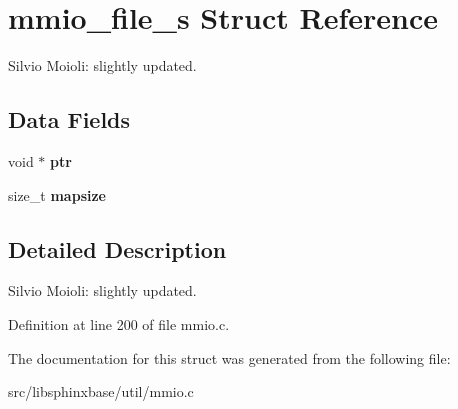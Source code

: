 \section{mmio\-\_\-file\-\_\-s Struct Reference}
\label{structmmio__file__s}


Silvio Moioli\-: slightly updated.  


\subsection*{Data Fields}
\begin{DoxyCompactItemize}
\item 
void $\ast$ {\bfseries ptr}\label{structmmio__file__s_ae1fe8bd596a0906965970108fa849b04}

\item 
size\-\_\-t {\bfseries mapsize}\label{structmmio__file__s_ab2357ad8c44382d8ccd679801692a718}

\end{DoxyCompactItemize}


\subsection{Detailed Description}
Silvio Moioli\-: slightly updated. 

Definition at line 200 of file mmio.\-c.



The documentation for this struct was generated from the following file\-:\begin{DoxyCompactItemize}
\item 
src/libsphinxbase/util/mmio.\-c\end{DoxyCompactItemize}
